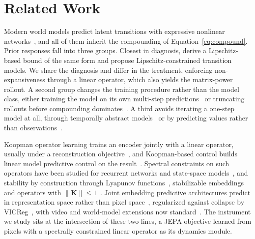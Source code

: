 \documentclass[10pt]{article} %
\newcommand{\K}{\mathbf{K}}
\begin{document}
\section{Related Work}
\label{sec:related}
Modern world models predict latent transitions with expressive nonlinear networks~\citep{Hafner2019Planet,Hafner2025,Hansen2023,Kaiser2020}, and all of them inherit the compounding of Equation~\ref{eq:compound}. Prior responses fall into three groups. Closest in diagnosis, \citet{Asadi2018} derive a Lipschitz-based bound of the same form and propose Lipschitz-constrained transition models. We share the diagnosis and differ in the treatment, enforcing non-expansiveness through a linear operator, which also yields the matrix-power rollout. A second group changes the training procedure rather than the model class, either training the model on its own multi-step predictions~\citep{Talvitie2014,Talvitie2017} or truncating rollouts before compounding dominates~\citep{Janner2019}. A third avoids iterating a one-step model at all, through temporally abstract models~\citep{Lo2024} or by predicting values rather than observations~\citep{Silver2017Predictron,Oh2017VPN,Schrittwieser2020}.

Koopman operator learning trains an encoder jointly with a linear operator, usually under a reconstruction objective~\citep{Lusch2018,Morton2018,Bevanda2021}, and Koopman-based control builds linear model predictive control on the result~\citep{KORDA2018149,9799788,9636408}. Spectral constraints on such operators have been studied for recurrent networks and state-space models~\citep{Erichson2019,Gu2022}, and stability by construction through Lyapunov functions~\citep{KolterManek2019}, stabilizable embeddings~\citep{zinage2022neural} and operators with $\|\K\| \le 1$~\citep{Mamakoukas2020}. Joint embedding predictive architectures predict in representation space rather than pixel space~\citep{schmidhuber1993discovering,LeCun2022,Assran2023}, regularized against collapse by VICReg~\citep{Bardes2022}, with video and world-model extensions now standard~\citep{Bardes2024,zhou2025dinowmworldmodelspretrained}. The instrument we study sits at the intersection of these two lines, a JEPA objective learned from pixels with a spectrally constrained linear operator as its dynamics module.
\end{document}
